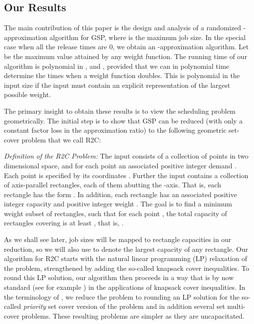 \documentclass[11pt]{article}
\begin{document}
\subsection{Our Results}
The main contribution of this paper is the design and analysis of
a randomized -approximation
algorithm for GSP,  where  is the maximum job size. 
In the special case when all the release times are 0, we
obtain an  -approximation algorithm.
Let  be the maximum value attained by any weight function.
The running time of our algorithm is polynomial in ,  and ,
provided that we can in polynomial time determine the times when a weight
function doubles. 
This is polynomial in the input size if the input 
must contain an explicit representation of the largest possible weight.




The primary insight to obtain these results is to view the scheduling problem geometrically.
The initial step is to show that GSP can be
reduced 
(with only a constant factor loss in the approximation ratio)
to the following geometric set-cover problem that we call R2C:

\bigskip

{\em Definition of the R2C Problem:}
The input consists of a collection of  points in two dimensional space,
and for each point  an associated positive integer demand .
Each point  is specified by its coordinates .
Further the input contains a collection  of axis-parallel rectangles, each of them abutting 
the -axis. That is, each rectangle  has the form  . 
In addition, each rectangle  has an associated positive integer capacity  
and positive integer weight .
The goal is to find a minimum weight subset  of rectangles, 
such that for each point , the total capacity of rectangles covering  is at least ,
that is, .

\bigskip
As we shall see later, job sizes will be mapped to rectangle capacities in our reduction,
so we will also use  to denote the largest capacity of any rectangle.
Our algorithm for R2C starts with the natural linear programming (LP) 
relaxation of the problem, 
strengthened by adding the so-called knapsack cover inequalities.
To round this LP solution, our algorithm then proceeds in a way that is by now standard (see for example \cite{CGK10}) in the applications of knapsack cover inequalities. In the terminology of \cite{CGK10}, we reduce the problem to rounding an LP solution for the so-called {\em priority} set cover version of the problem and in addition
several set multi-cover problems. These resulting problems are simpler as they are uncapacitated.
\end{document}
